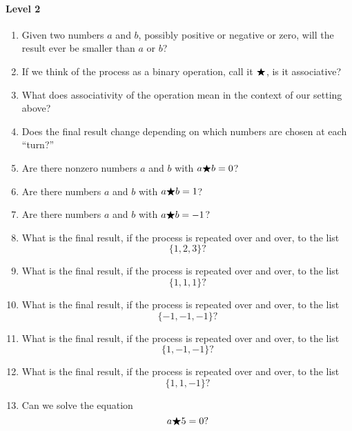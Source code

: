 \documentclass[nooutcomes]{ximera}
\begin{document}
\begin{problem}
\begin{freeResponse}
  \paragraph{Level 2}
  \begin{enumerate}
    \item Given two numbers $a$ and $b$, possibly positive or negative
      or zero, will the result ever be smaller than $a$ or $b$?
    \item If we think of the process as a binary operation, call it
      $\bigstar$, is it associative?
    \item What does associativity of the operation mean in the context
      of our setting above?
    \item Does the final result change depending on which numbers are
      chosen at each ``turn?''
    \item Are there nonzero numbers $a$ and $b$ with $a\bigstar b = 0$?
    \item Are there numbers $a$ and $b$ with $a\bigstar b = 1$?
    \item Are there numbers $a$ and $b$ with $a\bigstar b = -1$?
    \item What is the final result, if the process is repeated over
      and over, to the list
      \[
      \{1,2,3\}?
      \]
    \item What is the final result, if the process is repeated over
      and over, to the list
      \[
      \{1,1,1\}?
      \]
    \item What is the final result, if the process is repeated over
      and over, to the list
      \[
      \{-1,-1,-1\}?
      \]
    \item What is the final result, if the process is repeated over
      and over, to the list
      \[
      \{1,-1,-1\}?
      \]
  \item What is the final result, if the process is repeated over
      and over, to the list
      \[
      \{1,1,-1\}?
      \]
    \item Can we solve the equation
      \[
      a\bigstar 5 = 0?
      \]
\end{enumerate}


\end{freeResponse}
\end{problem}
\end{document}
